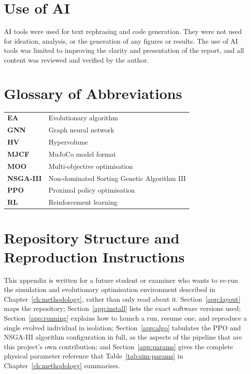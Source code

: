 \documentclass[12pt,a4paper]{report}
\begin{document}
\renewcommand{\bibname}{References}



\chapter*{Use of AI}
AI tools were used for text rephrasing and code generation. They were not used for ideation, analysis, or the generation of any figures or results. The use of AI tools was limited to improving the clarity and presentation of the report, and all content was reviewed and verified by the author.

\appendix

\chapter{Glossary of Abbreviations}
\begin{tabular}{ll}
\textbf{EA} & Evolutionary algorithm \\
\textbf{GNN} & Graph neural network \\
\textbf{HV} & Hypervolume \\
\textbf{MJCF} & MuJoCo model format \\
\textbf{MOO} & Multi-objective optimisation \\
\textbf{NSGA-III} & Non-dominated Sorting Genetic Algorithm III \\
\textbf{PPO} & Proximal policy optimisation \\
\textbf{RL} & Reinforcement learning \\
\end{tabular}

\chapter{Repository Structure and Reproduction Instructions}
\label{app:reproduce}
This appendix is written for a future student or examiner who wants to re-run the simulation and evolutionary optimisation environment described in Chapter~\ref{ch:methodology}, rather than only read about it. Section~\ref{app:layout} maps the repository; Section~\ref{app:install} lists the exact software versions used; Section~\ref{app:running} explains how to launch a run, resume one, and reproduce a single evolved individual in isolation; Section~\ref{app:algo} tabulates the PPO and NSGA-III algorithm configuration in full, as the aspects of the pipeline that are this project's own contribution; and Section~\ref{app:params} gives the complete physical parameter reference that Table~\ref{tab:sim-params} in Chapter~\ref{ch:methodology} summarises.
\end{document}
